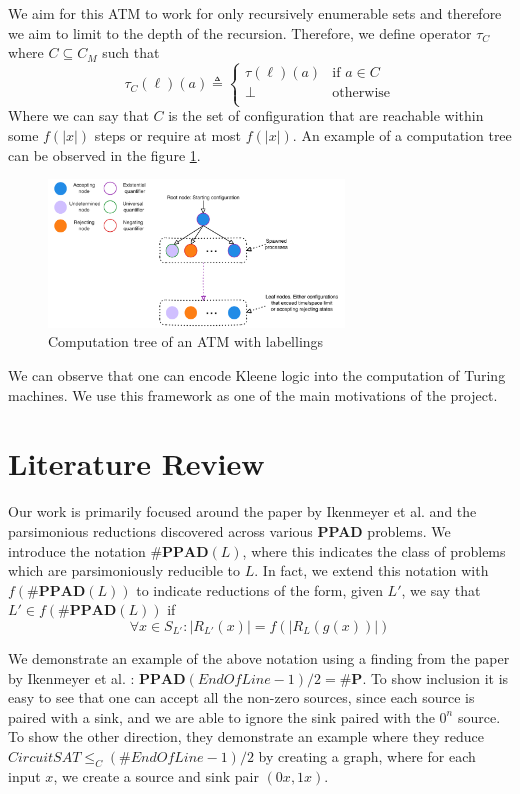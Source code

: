 We aim for this ATM to work for only recursively enumerable sets and therefore we aim to limit to
the depth of the recursion. Therefore, we define operator $\tau_C$ where $C \subseteq C_M$ such that
$$
    \tau_C(\ell)(a) \triangleq \begin{cases}
        \tau(\ell)(a) & \text{if } a \in C \\
        \bot          & \text{otherwise}   \\
    \end{cases}
$$
Where we can say that $C$ is the set of configuration that are reachable within some
$f(|x|)$ steps or require at most $f(|x|)$.
An example of a computation tree can be observed in the figure \ref{fig:chap-2:atm-comp-tree}.
\begin{figure}[h!]
    \centering
    \includegraphics[width=0.7\textwidth]{Chapter2/ATM-computation-graph.pdf}
    \caption{Computation tree of an ATM with labellings}
    \label{fig:chap-2:atm-comp-tree}
\end{figure}


We can observe that one can encode Kleene logic into the computation of Turing machines. We use
this framework as one of the main motivations of the project.

\section{Literature Review}

Our work is primarily focused around the paper by Ikenmeyer et al. \cite{ikenmeyer_WhatWhatNot_2022} and the
parsimonious reductions discovered across various \textbf{PPAD} problems.
We introduce the notation $\textbf{\#PPAD}(L)$, where this indicates
the class of problems which are parsimoniously reducible to $L$. 
In fact, we extend this notation with $f(\textbf{\#PPAD}(L))$  to indicate reductions of the form,
given $L'$, we say that $L' \in f(\textbf{\#PPAD}(L))$ if 
$$
\forall x \in S_{L'}: |R_{L'}(x)| = f(|R_L(g(x))|)
$$

We demonstrate an example of the above notation using a finding from the paper
by Ikenmeyer et al. \cite{ikenmeyer_WhatWhatNot_2022}: $\textbf{PPAD}(\textit{EndOfLine} -1) /2 = \textbf{\#P}$.
To show inclusion it is easy to see that one can accept all the non-zero sources, since each source is paired with a sink, 
and we are able to ignore the sink paired with the $0^n$ source. To show the other direction, they demonstrate an example
where they reduce $\textit{CircuitSAT} \leq_C (\textit{\#EndOfLine} -1) /2$ by creating a graph, where
for each input $x$, we create a source and sink pair $(0x, 1x)$.

